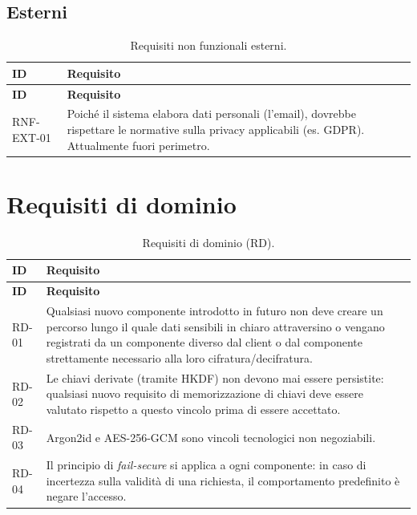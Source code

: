 \subsection{Esterni}

\begin{longtable}{p{2.6cm} p{\dimexpr\linewidth-2.6cm-4\tabcolsep\relax}}
\caption{Requisiti non funzionali esterni.} \\
\hline
\textbf{ID} & \textbf{Requisito} \\
\hline
\endfirsthead
\hline
\textbf{ID} & \textbf{Requisito} \\
\hline
\endhead
\hline
\endfoot
\hline
\endlastfoot
RNF-EXT-01 & Poiché il sistema elabora dati personali (l'email), dovrebbe rispettare le normative sulla privacy applicabili (es. GDPR). Attualmente fuori perimetro. \\
\end{longtable}

\section{Requisiti di dominio}

\begin{longtable}{p{2.6cm} p{\dimexpr\linewidth-2.6cm-4\tabcolsep\relax}}
\caption{Requisiti di dominio (RD).} \\
\hline
\textbf{ID} & \textbf{Requisito} \\
\hline
\endfirsthead
\hline
\textbf{ID} & \textbf{Requisito} \\
\hline
\endhead
\hline
\endfoot
\hline
\endlastfoot
RD-01 & Qualsiasi nuovo componente introdotto in futuro non deve creare un percorso lungo il quale dati sensibili in chiaro attraversino o vengano registrati da un componente diverso dal client o dal componente strettamente necessario alla loro cifratura/decifratura. \\
RD-02 & Le chiavi derivate (tramite HKDF) non devono mai essere persistite: qualsiasi nuovo requisito di memorizzazione di chiavi deve essere valutato rispetto a questo vincolo prima di essere accettato. \\
RD-03 & Argon2id e AES-256-GCM sono vincoli tecnologici non negoziabili. \\
RD-04 & Il principio di \emph{fail-secure} si applica a ogni componente: in caso di incertezza sulla validità di una richiesta, il comportamento predefinito è negare l'accesso. \\
\end{longtable}
